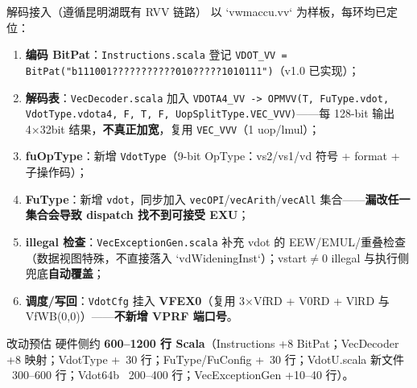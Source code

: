 \documentclass[aspectratio=169]{beamer}
\begin{document}
\begin{frame}{解码接入（遵循昆明湖既有 RVV 链路）}
以 `vwmaccu.vv` 为样板，每环均已定位：
\begin{enumerate}\footnotesize
  \item \textbf{编码 BitPat}：\texttt{Instructions.scala} 登记 \texttt{VDOT\_VV = BitPat("b111001???????????010?????1010111")}（v1.0 已实现）；
  \item \textbf{解码表}：\texttt{VecDecoder.scala} 加入 \texttt{VDOTA4\_VV -> OPMVV(T, FuType.vdot, VdotType.vdota4, F, T, F, UopSplitType.VEC\_VVV)}——每 128-bit 输出 4×32bit 结果，\textbf{不真正加宽}，复用 \texttt{VEC\_VVV}（1 uop/lmul）；
  \item \textbf{fuOpType}：新增 \texttt{VdotType}（9-bit OpType：vs2/vs1/vd 符号 + format + 子操作码）；
  \item \textbf{FuType}：新增 \texttt{vdot}，同步加入 \texttt{vecOPI}/\texttt{vecArith}/\texttt{vecAll} 集合——\textbf{漏改任一集合会导致 dispatch 找不到可接受 EXU}；
  \item \textbf{illegal 检查}：\texttt{VecExceptionGen.scala} 补充 vdot 的 EEW/EMUL/重叠检查（数据视图特殊，不直接落入 `vdWideningInst`）；vstart$\neq$0 illegal 与执行侧兜底\textbf{自动覆盖}；
  \item \textbf{调度/写回}：\texttt{VdotCfg} 挂入 \textbf{VFEX0}（复用 3×VfRD + V0RD + VlRD 与 VfWB(0,0)）——\textbf{不新增 VPRF 端口号}。
\end{enumerate}
\begin{alertblock}{改动预估}
\footnotesize 硬件侧约 \textbf{600–1200 行 Scala}（Instructions +8 BitPat；VecDecoder +8 映射；VdotType +~30 行；FuType/FuConfig +~30 行；VdotU.scala 新文件 ~300–600 行；Vdot64b ~200–400 行；VecExceptionGen +10–40 行）。
\end{alertblock}
\end{frame}
\end{document}
